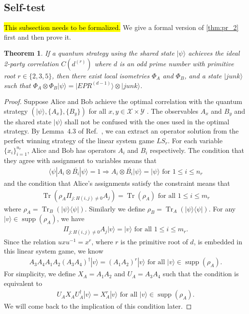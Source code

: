 \documentclass[11pt,letterpaper]{article}
\newcommand{\ket}[1]{|#1\rangle}
\newcommand{\bra}[1]{\langle#1|}
\newcommand{\ketbra}[2]{|#1\rangle\langle#2|}
\newcommand{\x}{\otimes}
\DeclareMathOperator{\Tr}{Tr}
\DeclareMathOperator{\supp}{supp}
\newcommand{\calX}{\mathcal{X}}
\newcommand{\calY}{\mathcal{Y}}
\newcommand{\1}{\mathbb{1}}
\newcommand{\EPR}[1]{EPR^{(#1)}}
\newcommand{\LS}{LS}
\newcommand{\dr}[1]{d^{(#1)}}
\newtheorem{theorem}{Theorem}
\theoremstyle{definition}
\begin{document}
\subsection{Self-test}
\hl{This subsection needs to be formalized.}
We give a formal version of \cref{thm:pr_2} first and then prove it.
\begin{theorem}
\label{thm:selftest}
	If a quantum strategy using the shared state $\ket{\psi}$ achieves the ideal 2-party correlation $C(\dr{r})$ where $d$ is an odd
	prime number with primitive root $r \in \{2,3,5\}$, then there exist local isometries $\Phi_A$ and $\Phi_B$, and a state $\ket{junk}$ such 
	that $\Phi_A\x\Phi_B \ket{\psi} = \ket{\EPR{d-1}} \x \ket{junk}$.
\end{theorem}
\begin{proof}
Suppose Alice and Bob achieve the optimal correlation with the quantum strategy $(\ket{\psi}, \{A_x\}, \{B_y\})$
for all $x,y \in \calX \times \calY$ .
The observables $A_x$ and $B_y$ and the shared state $\ket{\psi}$ shall not be confused with the ones used in the optimal strategy.
By Lemma~$4.3$ of Ref.~\cite{coladan2017}, we can extract an operator solution from the perfect winning strategy 
of the linear system game $\LS_r$. 
For each variable $\{ x_i \}_{i=1}^{n_r}$, Alice and Bob has operators $A_i$ and $B_i$ respectively.
The condition that they agree with assignment to variables means that 
\begin{align}
	\bra{\psi} A_i \otimes \overline{B_i} \ket{\psi} = 1 \Rightarrow A_i \otimes \overline{B_i} \ket{\psi} = \ket{\psi}
	\text{ for } 1 \leq i \leq n_r
\end{align}
and the condition that Alice's assignments satisfy the constraint means that 
\begin{align}
	\Tr(\rho_A \Pi_{j: H(i,j) \neq 0} A_j) = \Tr(\rho_A) \text{ for all } 1 \leq i \leq m_r
\end{align}
where $\rho_A =  \Tr_B(\ketbra{\psi}{\psi})$. 
Similarly we define $\rho_B = \Tr_A(\ketbra{\psi}{\psi})$.
For any $\ket{v} \in \supp(\rho_A)$,
we have 
\begin{align}
\Pi_{j:H(i,j) \neq 0} A_j \ket{v} = \ket{v} \text{ for all } 1 \leq i \leq m_r.
\end{align}
Since the relation $uxu^{-1} = x^r$, where $r$ is the primitive root of $d$, is embedded in this linear system game, we know
\begin{align}
	A_3A_4 A_1A_2 (A_3A_4)^\dagger \ket{v}= (A_1A_2)^r \ket{v} \text{ for all } \ket{v} \in \supp(\rho_A).
\end{align}
For simplicity, we define $X_A = A_1A_2$ and $U_A=A_3A_4$ such that
the condition is equivalent to
\begin{align}
	\label{eq:ux_relation}
	U_AX_AU_A^\dagger \ket{v} = X_A^r \ket{v} \text{ for all } \ket{v} \in \supp(\rho_A).
\end{align}
We will come back to the implication of this condition later.


\end{proof}
\end{document}
